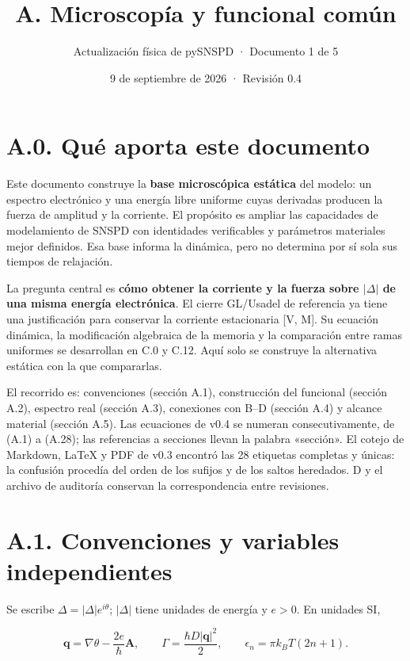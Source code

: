 \documentclass[
  spanish,
  10pt,
  a4paper,
]{article}
\title{A. Microscopía y funcional común}
\subtitle{Actualización física de pySNSPD · Documento 1 de 5}
\author{}
\date{9 de septiembre de 2026 · Revisión 0.4}
\begin{document}
\maketitle

{
\setcounter{tocdepth}{2}
\tableofcontents
}
\newpage

\section{A.0. Qué aporta este
documento}\label{a.0.-quuxe9-aporta-este-documento}

Este documento construye la \textbf{base microscópica estática} del
modelo: un espectro electrónico y una energía libre uniforme cuyas
derivadas producen la fuerza de amplitud y la corriente. El propósito es
ampliar las capacidades de modelamiento de SNSPD con identidades
verificables y parámetros materiales mejor definidos. Esa base informa
la dinámica, pero no determina por sí sola sus tiempos de relajación.

La pregunta central es \textbf{cómo obtener la corriente y la fuerza
sobre \(|\Delta|\) de una misma energía electrónica}. El cierre
GL/Usadel de referencia ya tiene una justificación para conservar la
corriente estacionaria {[}V, M{]}. Su ecuación dinámica, la modificación
algebraica de la memoria y la comparación entre ramas uniformes se
desarrollan en C.0 y C.12. Aquí solo se construye la alternativa
estática con la que compararlas.

El recorrido es: convenciones (sección A.1), construcción del funcional
(sección A.2), espectro real (sección A.3), conexiones con B--D (sección
A.4) y alcance material (sección A.5). Las ecuaciones de v0.4 se numeran
consecutivamente, de (A.1) a (A.28); las referencias a secciones llevan
la palabra «sección». El cotejo de Markdown, LaTeX y PDF de v0.3
encontró las 28 etiquetas completas y únicas: la confusión procedía del
orden de los sufijos y de los saltos heredados. D y el archivo de
auditoría conservan la correspondencia entre revisiones.

\section{A.1. Convenciones y variables
independientes}\label{a.1.-convenciones-y-variables-independientes}

Se escribe \(\Delta=|\Delta|e^{i\theta}\); \(|\Delta|\) tiene unidades
de energía y \(e>0\). En unidades SI,

\[
\mathbf q=\nabla\theta-\frac{2e}{\hbar}\mathbf A,
\qquad \Gamma=\frac{\hbar D|\mathbf q|^2}{2},
\qquad \epsilon_n=\pi k_BT(2n+1).
\tag{A.1}
\]
\end{document}
